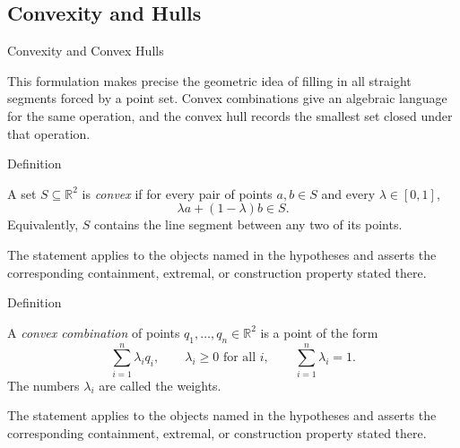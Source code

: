 
\subsection*{Convexity and Hulls}

\begin{topicbox}{Convexity and Convex Hulls}
\begin{exposition}
This formulation makes precise the geometric idea of filling in all straight
segments forced by a point set. Convex combinations give an algebraic language
for the same operation, and the convex hull records the smallest set closed
under that operation.
\end{exposition}

\begin{definitionbox}{Definition}
\begin{definition}
\label{def:computational-geometry-convex-set}
A set \(S \subseteq \mathbb{R}^2\) is \emph{convex} if for every pair of points
\(a,b\in S\) and every \(\lambda\in[0,1]\),
\[
  \lambda a+(1-\lambda)b\in S.
\]
Equivalently, \(S\) contains the line segment between any two of its points.
\end{definition}
\end{definitionbox}

\begin{remark*}
The statement applies to the objects named in the hypotheses and asserts the
corresponding containment, extremal, or construction property stated there.
\end{remark*}

\NoLocalDependencies

\begin{definitionbox}{Definition}
\begin{definition}
\label{def:computational-geometry-convex-combination}
A \emph{convex combination} of points
\(q_1,\dots,q_n\in\mathbb{R}^2\) is a point of the form
\[
  \sum_{i=1}^{n}\lambda_i q_i,
  \qquad
  \lambda_i\ge 0 \text{ for all } i,
  \qquad
  \sum_{i=1}^{n}\lambda_i=1.
\]
The numbers \(\lambda_i\) are called the weights.
\end{definition}
\end{definitionbox}

\begin{remark*}
The statement applies to the objects named in the hypotheses and asserts the
corresponding containment, extremal, or construction property stated there.
\end{remark*}


\end{topicbox}
